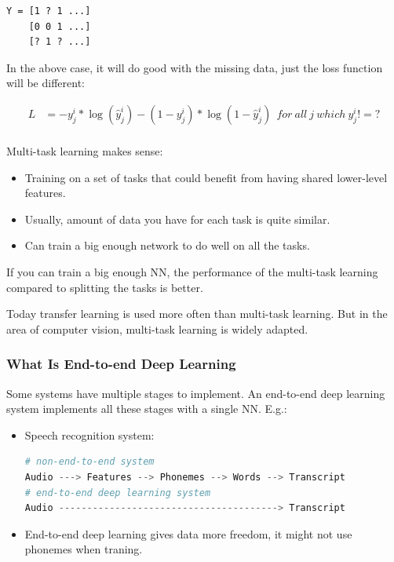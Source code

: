 \begin{lstlisting}
Y = [1 ? 1 ...]
    [0 0 1 ...]
    [? 1 ? ...]
\end{lstlisting}

In the above case, it will do good with the missing data, just the loss function will be different:

\begin{equation}
    \begin{aligned}
        L &= - y^i_j * \log (\hat{y}^i_j) - (1 - y^i_j) * \log (1 - \hat{y}^i_j)\ \  for\  all \ j \ which \  y^i_j != ?\\
    \end{aligned}
\end{equation}

Multi-task learning makes sense:

\begin{itemize}
    \item Training on a set of tasks that could benefit from having shared lower-level features.
    \item Usually, amount of data you have for each task is quite similar.
    \item Can train a big enough network to do well on all the tasks.
\end{itemize}

If you can train a big enough NN, the performance of the multi-task learning compared to splitting the tasks is better.

Today transfer learning is used more often than multi-task learning. But in the area of computer vision, multi-task learning is widely adapted.

\subsubsection{What Is End-to-end Deep Learning}
Some systems have multiple stages to implement. An end-to-end deep learning system implements all these stages with a single NN. E.g.:

\begin{itemize}
    \item Speech recognition system:
\begin{lstlisting}[language=python]
# non-end-to-end system
Audio ---> Features --> Phonemes --> Words --> Transcript    
# end-to-end deep learning system
Audio ---------------------------------------> Transcript    
\end{lstlisting}
    \item End-to-end deep learning gives data more freedom, it might not use phonemes when traning.
\end{itemize}

